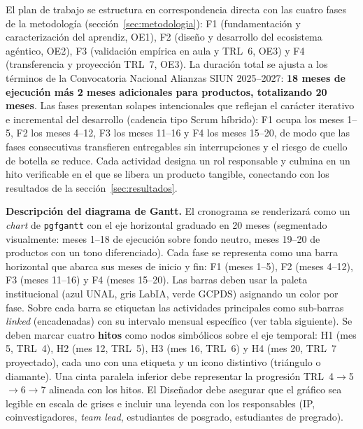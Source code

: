

El plan de trabajo se estructura en correspondencia directa con las cuatro fases
de la metodología (sección~\ref{sec:metodologia}): F1 (fundamentación y
caracterización del aprendiz, OE1), F2 (diseño y desarrollo del ecosistema
agéntico, OE2), F3 (validación empírica en aula y TRL~6, OE3) y F4 (transferencia
y proyección TRL~7, OE3). La duración total se ajusta a los términos de la
Convocatoria Nacional Alianzas SIUN 2025--2027: \textbf{18 meses de ejecución más
2 meses adicionales para productos, totalizando 20 meses}. Las fases presentan
solapes intencionales que reflejan el carácter iterativo e incremental del
desarrollo (cadencia tipo Scrum híbrido): F1 ocupa los meses 1--5, F2 los meses
4--12, F3 los meses 11--16 y F4 los meses 15--20, de modo que las fases
consecutivas transfieren entregables sin interrupciones y el riesgo de cuello de
botella se reduce. Cada actividad designa un rol responsable y culmina en un hito
verificable en el que se libera un producto tangible, conectando con los
resultados de la sección~\ref{sec:resultados}.

\medskip


\noindent\textbf{Descripción del diagrama de Gantt.}
El cronograma se renderizará como un \emph{chart} de \texttt{pgfgantt} con el
eje horizontal graduado en 20 meses (segmentado visualmente: meses 1--18 de
ejecución sobre fondo neutro, meses 19--20 de productos con un tono diferenciado).
Cada fase se representa como una barra horizontal que abarca sus meses de inicio y
fin: F1 (meses 1--5), F2 (meses 4--12), F3 (meses 11--16) y F4 (meses 15--20).
Las barras deben usar la paleta institucional (azul UNAL, gris LabIA, verde
GCPDS) asignando un color por fase. Sobre cada barra se etiquetan las actividades
principales como sub-barras \emph{linked} (encadenadas) con su intervalo mensual
específico (ver tabla siguiente). Se deben marcar cuatro \textbf{hitos} como
nodos simbólicos sobre el eje temporal: H1 (mes 5, TRL~4), H2 (mes 12, TRL~5), H3
(mes 16, TRL~6) y H4 (mes 20, TRL~7 proyectado), cada uno con una etiqueta y un
icono distintivo (triángulo o diamante). Una cinta paralela inferior debe
representar la progresión TRL~4$\to$5$\to$6$\to$7 alineada con los hitos. El
Diseñador debe asegurar que el gráfico sea legible en escala de grises e incluir
una leyenda con los responsables (IP, coinvestigadores, \emph{team lead},
estudiantes de posgrado, estudiantes de pregrado).

